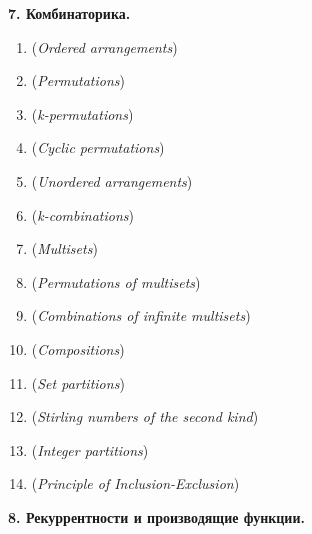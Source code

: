 \documentclass[12pt]{article}
\begin{document}
    \begin{center}
        \textbf{7. Комбинаторика.}
    \end{center}


    \begin{enumerate}
        \item \textbf{} (\textit{Ordered arrangements})

        \item \textbf{} (\textit{Permutations})

        \item \textbf{} (\textit{k-permutations})

        \item \textbf{} (\textit{Cyclic permutations})

        \item \textbf{} (\textit{Unordered arrangements})

        \item \textbf{} (\textit{k-combinations})

        \item \textbf{} (\textit{Multisets})

        \item \textbf{} (\textit{Permutations of multisets})

        \item \textbf{} (\textit{Combinations of infinite multisets})

        \item \textbf{} (\textit{Compositions})

        \item \textbf{} (\textit{Set partitions})

        \item \textbf{} (\textit{Stirling numbers of the second kind})

        \item \textbf{} (\textit{Integer partitions})

        \item \textbf{} (\textit{Principle of Inclusion-Exclusion})

    \end{enumerate}

    \begin{center}
        \textbf{8. Рекуррентности и производящие функции.}
    \end{center}
\end{document}
